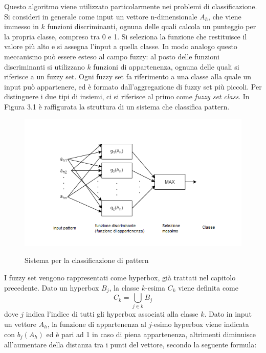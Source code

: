 \documentclass[11pt,  oneside, openany]{book}
\begin{document}
Questo algoritmo viene utilizzato particolarmente nei problemi di classificazione. Si consideri in generale come input un vettore n-dimensionale $A_h$, che viene immesso in $k$ funzioni discriminanti, ognuna delle quali calcola un punteggio per la propria classe, compreso tra 0 e 1. Si seleziona la funzione che restituisce il valore più alto e si assegna l'input a quella classe. In modo analogo questo meccanismo può essere esteso al campo fuzzy: al posto delle funzioni discriminanti si utilizzano $k$ funzioni di appartenenza, ognuna delle quali si riferisce a un fuzzy set. Ogni fuzzy set fa riferimento a una classe alla quale un input può appartenere, ed è formato dall'aggregazione di fuzzy set più piccoli. Per distinguere i due tipi di insiemi, ci si riferisce al primo come \textit{fuzzy set class}. In Figura 3.1 è raffigurata la struttura di un sistema che classifica pattern. 

\begin{figure}[h!]
\begin{center}
  \includegraphics[width=12cm]{Immagini/FMMNN_nn.png}\\
  \caption{Sistema per la classificazione di pattern}
\end{center}
\end{figure}

I fuzzy set vengono rappresentati come hyperbox, già trattati nel capitolo precedente. Dato un hyperbox $B_j$, la classe $k$-esima $C_k$ viene definita come
$$ C_k = \bigcup_{j \in k} B_j $$
\noindent dove $j$ indica l'indice di tutti gli hyperbox associati alla classe $k$. %
Dato in input un vettore $A_h$, la funzione di appartenenza  al $j$-esimo hyperbox viene indicata con $b_j(A_h)$ ed è pari ad 1 in caso di piena appartenenza, altrimenti diminuisce all'aumentare della distanza tra i punti del vettore, secondo la seguente formula: 
\end{document}
